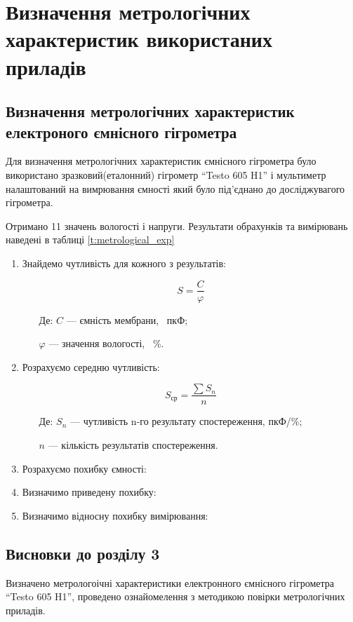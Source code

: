 \chapter{Визначення метрологічних характеристик використаних приладів}
\section{Визначення метрологічних характеристик електроного ємнісного гігрометра}

Для визначення метрологічних характеристик ємнісного гігрометра було використано
зразковий(еталонний) гігрометр ``Testo 605 H1'' і мультиметр налаштований на вимрювання ємності який
було під’єднано до досліджувагого гігрометра.

Отримано 11 значень вологості і напруги. Результати обрахунків та вимірювань наведені в таблиці \ref{t:metrological_exp}



\begin{enumerate}[leftmargin=*]
    \item Знайдемо чутливість для кожного з результатів:

    \begin{equation}
        S = \frac{C}{\varphi}
    \end{equation}

    \begin{itemize}
        \item [Де:] $C$ --- ємність мембрани, ~пкФ;
        \item []$\varphi$ ---  значення вологості, ~\%.
    \end{itemize}

    

    \item Розрахуємо середню чутливість:

    \begin{equation}
    S_{\text{ср}} = \frac{\sum S_n}{n}
    \end{equation}

    \begin{itemize}
        \item [Де:] $S_n$ --- чутливість n-го результату спостереження, пкФ/\%;
        \item []$n$ ---  кількість результатів спостереження.
    \end{itemize}

    

    \item Розрахуємо похибку ємності:

    \item Визначимо приведену похибку:

    \item Визначимо відносну похибку вимірювання:
\end{enumerate}

\section*{Висновки до розділу 3}

Визначено метрологоічні характеристики електронного ємнісного гігрометра ``Testo 605 H1'', проведено
ознайомелення з методикою повірки метрологічних приладів.
